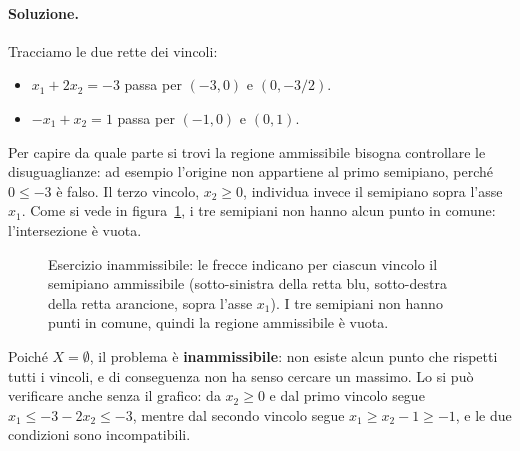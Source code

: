 \paragraph{Soluzione.}
Tracciamo le due rette dei vincoli:
\begin{itemize}
    \item $x_1 + 2x_2 = -3$ passa per $(-3, 0)$ e $(0, -3/2)$.
    \item $-x_1 + x_2 = 1$ passa per $(-1, 0)$ e $(0, 1)$.
\end{itemize}
Per capire da quale parte si trovi la regione ammissibile bisogna controllare le disuguaglianze: ad esempio l'origine non appartiene al primo semipiano, perché $0 \le -3$ è falso. Il terzo vincolo, $x_2 \ge 0$, individua invece il semipiano sopra l'asse $x_1$. Come si vede in figura~\ref{fig:es-inammissibile}, i tre semipiani non hanno alcun punto in comune: l'intersezione è vuota.

\begin{figure}[htbp]
\centering
{}
\caption{Esercizio inammissibile: le frecce indicano per ciascun vincolo il semipiano ammissibile (sotto-sinistra della retta blu, sotto-destra della retta arancione, sopra l'asse $x_1$). I tre semipiani non hanno punti in comune, quindi la regione ammissibile è vuota.}
\label{fig:es-inammissibile}
\end{figure}

Poiché $X = \emptyset$, il problema è \textbf{inammissibile}: non esiste alcun punto che rispetti tutti i vincoli, e di conseguenza non ha senso cercare un massimo. Lo si può verificare anche senza il grafico: da $x_2 \ge 0$ e dal primo vincolo segue $x_1 \le -3 - 2x_2 \le -3$, mentre dal secondo vincolo segue $x_1 \ge x_2 - 1 \ge -1$, e le due condizioni sono incompatibili.

